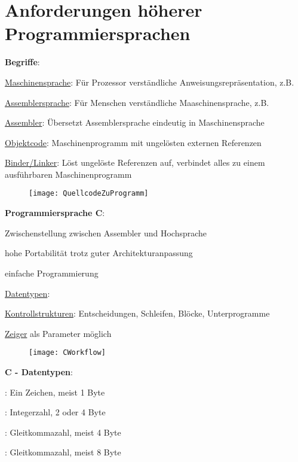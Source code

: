 \section{Anforderungen höherer Programmiersprachen}
\label{sec:anforderungen}

\textbf{Begriffe}:
\begin{items}
  \item \underline{Maschinensprache}: Für Prozessor verständliche Anweisungsrepräsentation, z.B. 
  \item \underline{Assemblersprache}: Für Menschen verständliche Maaschinensprache, z.B. 
  \item \underline{Assembler}: Übersetzt Assemblersprache eindeutig in Maschinensprache
  \item \underline{Objektcode}: Maschinenprogramm mit ungelösten externen Referenzen
  \item \underline{Binder/Linker}: Löst ungelöste Referenzen auf, verbindet alles zu einem ausführbaren Maschinenprogramm
\end{items}
\begin{figure}[ht]
  \centering
  \texttt{[image: QuellcodeZuProgramm]}
  \label{QuellcodeZuProgramm}
\end{figure}

\textbf{Programmiersprache C}:
\begin{items}
  \item Zwischenstellung zwischen Assembler und Hochsprache
  \item hohe Portabilität trotz guter Architekturanpassung
  \item einfache Programmierung
  \item \underline{Datentypen}: 
  \item \underline{Kontrollstrukturen}: Entscheidungen, Schleifen, Blöcke, Unterprogramme
  \item \underline{Zeiger} als Parameter möglich
\end{items}
\begin{figure}[ht]
  \centering
  \texttt{[image: CWorkflow]}
  \label{CWorkflow}
\end{figure}

\newpage

\textbf{C - Datentypen}:
\begin{items}
  \item \underline{}: Ein Zeichen, meist 1 Byte
  \item \underline{}: Integerzahl, 2 oder 4 Byte
  \item \underline{}: Gleitkommazahl, meist 4 Byte
  \item \underline{}: Gleitkommazahl, meist 8 Byte
\end{items}

